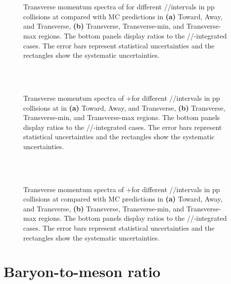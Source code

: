 \begin{figure}[H]%
\\
\\
\caption{Transverse momentum spectra of \KOs for different \RT/\RTmin/\RTmax intervals in pp collisions at  compared with MC predictions in \textbf{(a)} Toward, Away, and Transverse, \textbf{(b)} Transverse, Transverse-min, and Transverse-max regions. The bottom panels display ratios to the \RT/\RTmin/\RTmax-integrated cases. The error bars represent statistical uncertainties and the rectangles show the systematic uncertainties.}
\label{fig:rt:ptK0sMC}
\end{figure}

\begin{figure}[H]%
\\
\\
\caption{Transverse momentum spectra of \LA+\AL for different \RT/\RTmin/\RTmax intervals in pp collisions at  in \textbf{(a)} Toward, Away, and Transverse, \textbf{(b)} Transverse, Transverse-min, and Transverse-max regions. The bottom panels display ratios to the \RT/\RTmin/\RTmax-integrated cases. The error bars represent statistical uncertainties and the rectangles show the systematic uncertainties.}
\label{fig:rt:ptLA}
\end{figure}


\begin{figure}[H]%
\\
\\
\caption{Transverse momentum spectra of \LA+\AL for different \RT/\RTmin/\RTmax intervals in pp collisions at  compared with MC predictions in \textbf{(a)} Toward, Away, and Transverse, \textbf{(b)} Transverse, Transverse-min, and Transverse-max regions. The bottom panels display ratios to the \RT/\RTmin/\RTmax-integrated cases. The error bars represent statistical uncertainties and the rectangles show the systematic uncertainties.}
\label{fig:rt:ptLAMC}
\end{figure}

\section{Baryon-to-meson ratio}

